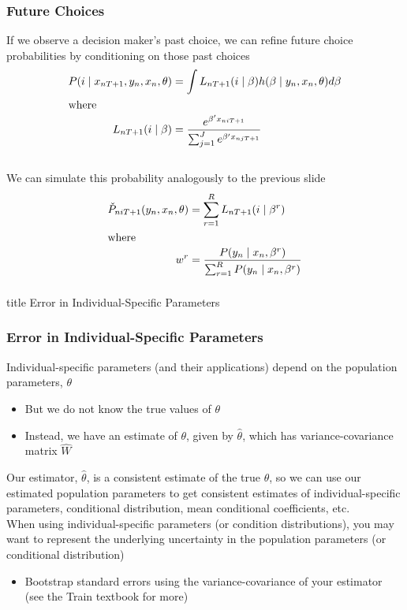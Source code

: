 \documentclass{beamer}\usepackage[]{graphicx}\usepackage[]{color}
\begin{document}
\begin{frame}\frametitle{Future Choices}
    If we observe a decision maker's past choice, we can refine future choice probabilities by conditioning on those past choices
    \begin{align*}
    	P(i \mid x_{nT+1}, y_n, x_n, \theta) &= \int L_{nT+1} (i \mid \beta) h(\beta \mid y_n, x_n, \theta) d \beta \\
    	\intertext{where}
    	L_{nT+1} (i \mid \beta) &= \frac{e^{\beta' x_{niT+1}}}{\sum_{j = 1}^J e^{\beta' x_{njT+1}}}
    \end{align*} \\
    \vspace{2ex}
    We can simulate this probability analogously to the previous slide
    \begin{align*}
    	\check{P}_{niT+1}(y_n, x_n, \theta) &= \sum_{r = 1}^R L_{nT+1}(i \mid \beta^r)\\
    	\intertext{where}
    	w^r &= \frac{P(y_n \mid x_n, \beta^r)}{\sum_{r = 1}^R P(y_n \mid x_n, \beta^r)}
    \end{align*}
\end{frame}

\begin{frame}\frametitle{}
    \vfill
    \centering
    \begin{beamercolorbox}[center]{title}
        \Large Error in Individual-Specific Parameters
    \end{beamercolorbox}
    \vfill
\end{frame}

\begin{frame}\frametitle{Error in Individual-Specific Parameters}
    Individual-specific parameters (and their applications) depend on the population parameters, $\theta$
    \begin{itemize}
    	\item But we do not know the true values of $\theta$
    	\item Instead, we have an estimate of $\theta$, given by $\hat{\theta}$, which has variance-covariance matrix $\hat{W}$
    \end{itemize}
    \vspace{2ex}
    Our estimator, $\hat{\theta}$, is a consistent estimate of the true $\theta$, so we can use our estimated population parameters to get consistent estimates of individual-specific parameters, conditional distribution, mean conditional coefficients, etc. \\
    \vspace{2ex}
    When using individual-specific parameters (or condition distributions), you may want to represent the underlying uncertainty in the population parameters (or conditional distribution)
    \begin{itemize}
    	\item Bootstrap standard errors using the variance-covariance of your estimator (see the Train textbook for more)
    \end{itemize}
\end{frame}
\end{document}
